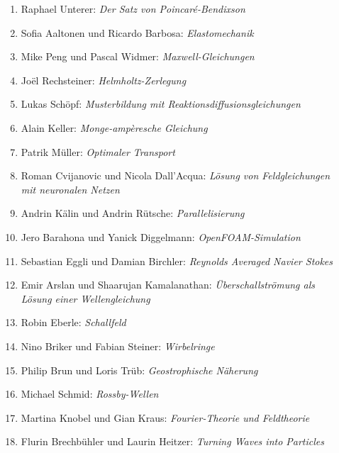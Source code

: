 \documentclass[handout]{beamer}
\begin{document}
\begin{frame}
\begin{columns}[t,onlytextwidth]
\begin{column}{0.60\textwidth}
\begin{description}
\begin{enumerate}
\item Raphael Unterer: {\em Der Satz von Poincaré-Bendixson}
\item Sofia Aaltonen und Ricardo Barbosa: {\em Elastomechanik}
\item Mike Peng und Pascal Widmer: {\em Maxwell-Gleichungen}
\setcounter{enumi}{19}
\item Joël Rechsteiner: {\em Helmholtz-Zerlegung}
\item Lukas Schöpf: {\em Musterbildung mit Reaktionsdiffusionsgleichungen}
\item Alain Keller: {\em Monge-ampèresche Gleichung}
\item Patrik Müller: {\em Optimaler Transport}
\item Roman Cvijanovic und Nicola Dall'Acqua:
{\em Lösung von Feldgleichungen mit neuronalen Netzen}
\item Andrin Kälin und Andrin Rütsche: {\em Parallelisierung}
\item Jero Barahona und Yanick Diggelmann: {\em OpenFOAM-Simulation}
\item Sebastian Eggli und Damian Birchler: {\em Reynolds Averaged Navier Stokes}
\item Emir Arslan und Shaarujan Kamalanathan:
{\em Überschallströmung als Lösung einer Wellengleichung}
\item Robin Eberle: {\em Schallfeld}
\item Nino Briker und Fabian Steiner: {\em Wirbelringe}
\item Philip Brun und Loris Trüb: {\em Geostrophische Näherung}
\item Michael Schmid: {\em Rossby-Wellen}
\item Martina Knobel und Gian Kraus: {\em Fourier-Theorie und Feldtheorie}
\item Flurin Brechbühler und Laurin Heitzer: {\em Turning Waves into Particles}
\end{enumerate}
\end{description}
\end{column}
\begin{column}{0.01\textwidth}
\end{column}
\end{columns}
\end{frame}
\end{document}
